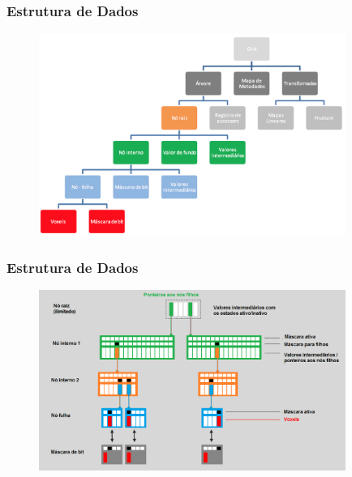 \documentclass{beamer}
\begin{document}
\subsection{}
\begin{frame}

\frametitle{Estrutura de Dados}

\begin{figure}[!htb]
\center
\includegraphics[width=10cm]{tree_structure}  
\end{figure}

\end{frame}

\begin{frame}

\frametitle{Estrutura de Dados}

\begin{figure}[!htb]
\center
\includegraphics[width=10cm]{tree_inverted}  
\end{figure}

\end{frame}

\end{document}
